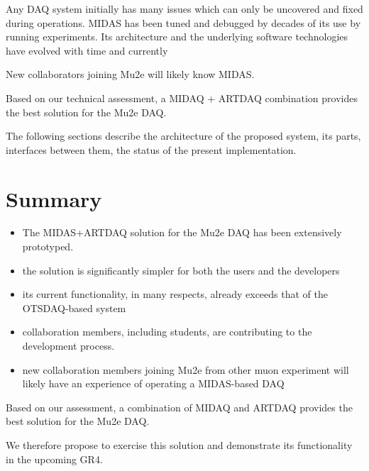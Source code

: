 \documentclass[12pt]{article}
\begin{document}
Any DAQ system initially has many issues which can only be uncovered and fixed
during operations. MIDAS has been tuned and debugged by decades of its use by
running experiments. Its architecture and the underlying software technologies
have evolved with time and currently

New collaborators joining Mu2e will likely know MIDAS.

Based on our technical assessment, a MIDAQ + ARTDAQ combination provides
the best solution for the Mu2e DAQ.

The following sections describe the architecture of the proposed system,
its parts, interfaces between them, the status of the present implementation.



% 




\section {Summary}

\begin{itemize}
\item 
  The MIDAS+ARTDAQ solution for the Mu2e DAQ has been extensively prototyped.
\item
  the solution is significantly simpler for both the users and the developers
\item
  its current functionality, in many respects, already exceeds that
  of the OTSDAQ-based system  
\item
  collaboration members, including students, are contributing
  to the development process. 
\item
  new collaboration members joining Mu2e from other muon experiment will
  likely have an experience of operating a MIDAS-based DAQ
\end{itemize}

Based on our assessment, a combination of MIDAQ and  ARTDAQ
provides the best solution for the Mu2e DAQ.

We therefore propose to exercise this solution and demonstrate
its functionality in the upcoming GR4.

%
\newpage



% 

\end{document}
